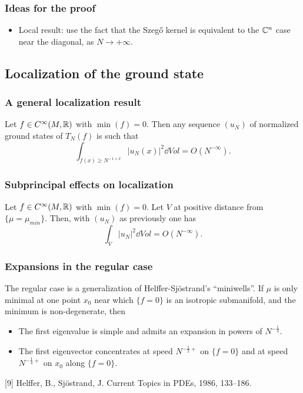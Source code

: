 \documentclass[mathserif]{beamer}
\begin{document}
\begin{frame}
  \frametitle{Ideas for the proof}
  \begin{itemize}
  \item Local result: use the fact that the Szeg\H{o} kernel is
    equivalent to the $\mathbb{C}^n$ case near the diagonal, as $N\to
    +\infty$.
  \end{itemize}
\end{frame}

\subsection{Localization of the ground state}
\begin{frame}
  \frametitle{A general localization result}
  \begin{thm}
    Let $f\in C^{\infty}(M,\mathbb{R})$ with $\min(f)=0$.
    Then any sequence $(u_N)$ of normalized ground states of $T_N(f)$ is such that
$$\int_{f(x)\geq N^{-1+\delta}}|u_N(x)|^2 \dd Vol=O(N^{-\infty}).$$
  \end{thm}


\end{frame}

\begin{frame}
\frametitle{Subprincipal effects on localization}
  \begin{thm}
    Let $f\in C^{\infty}(M,\mathbb{R})$ with $\min(f)=0$. Let $V$ at positive
    distance from $\{\mu=\mu_{min}\}$.
    Then, with $(u_N)$ as previously one has $$\int_{V}|u_N|^2\dd Vol=O(N^{-\infty}).$$
  \end{thm}
\end{frame}

\begin{frame}
  \frametitle{Expansions in the regular case}
  The regular case is a generalization of Helffer-Sj\"ostrand's
  ``miniwells''.
If $\mu$ is only minimal at one point $x_0$ near which $\{f=0\}$ is
    an isotropic submanifold, and the minimum is non-degenerate, then
    \begin{itemize}
    \item The first eigenvalue is simple and admits an expansion in
      powers of $N^{-\frac 14}$.
    \item The first eigenvector concentrates at speed $N^{-\frac 12+}$
      on $\{f=0\}$ and at speed $N^{-\frac 14+}$ on $x_0$ along
      $\{f=0\}$.
    \end{itemize}

\vspace{2em}
\small{[9] Helffer, B., Sjöstrand, J. Current Topics in PDEs, 1986, 133–186.}
\end{frame}
\end{document}
